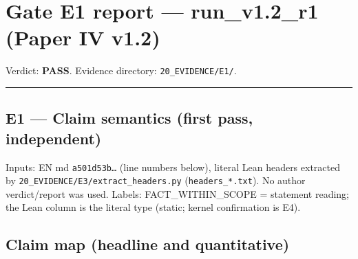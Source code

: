 \documentclass[
]{article}
\author{}
\date{}
\begin{document}
\section{Gate E1 report --- run\_v1.2\_r1 (Paper IV
v1.2)}\label{gate-e1-report--run_v12_r1-paper-iv-v12}

Verdict: \textbf{PASS}. Evidence directory: \texttt{20\_EVIDENCE/E1/}.

\begin{center}\rule{0.5\linewidth}{0.5pt}\end{center}

\subsection{E1 --- Claim semantics (first pass,
independent)}\label{e1--claim-semantics-first-pass-independent}

Inputs: EN md \texttt{a501d53b…} (line numbers below), literal Lean
headers extracted by \texttt{20\_EVIDENCE/E3/extract\_headers.py}
(\texttt{headers\_*.txt}). No author verdict/report was used. Labels:
FACT\_WITHIN\_SCOPE = statement reading; the Lean column is the literal
type (static; kernel confirmation is E4).

\subsection{Claim map (headline and
quantitative)}\label{claim-map-headline-and-quantitative}
\end{document}
